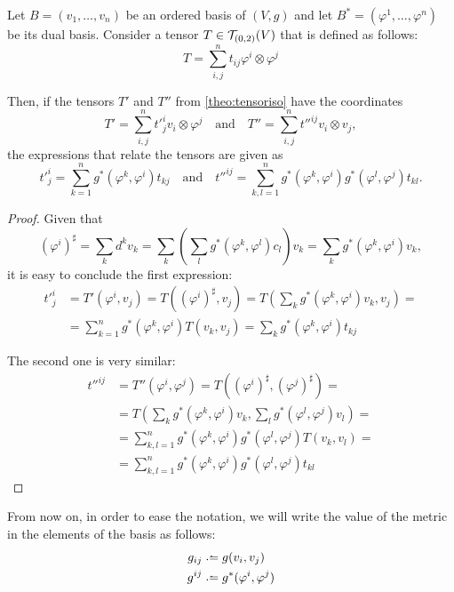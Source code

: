 \begin{proposition}
	\label{pro:musicalcoord}
	Let $B = (v_1, \dots, v_n)$ be an ordered basis of $(V,g)$ and let $B^* = (\varphi^1, \dots, \varphi^n)$ be its dual basis. Consider a tensor $T\in{\mathcal T}_{(0,2)}(V)$ that is defined as follows:
	\[
		T = \sum_{i,j}^{n} t_{ij} \varphi^i \otimes \varphi^j
	\]
	
	Then, if the tensors $T'$ and $T''$ from \autoref{theo:tensoriso} have the coordinates
	\[
		T' = \sum_{i,j}^{n} t'^i_j v_i \otimes \varphi^j
		\quad \textrm{and} \quad
		T'' = \sum_{i,j}^{n} t''^{ij} v_i \otimes v_j,
	\]
	the expressions that relate the tensors are given as
	\[
		t'^i_j = \sum_{k=1}^n g^*(\varphi^k, \varphi^i) t_{kj}
		\quad \textrm{and} \quad
		t''^{ij} = \sum_{k,l = 1}^n g^*(\varphi^k, \varphi^i) g^*(\varphi^l, \varphi^j) t_{kl}.
	\]
\end{proposition}

\begin{proof}
	Given that
	\[
		(\varphi^i)^\sharp = \sum_k d^k v_k = \sum_k (\sum_l g^*(\varphi^k, \varphi^l) c_l) v_k = \sum_k g^*(\varphi^k, \varphi^i) v_k,
	\]
	it is easy to conclude the first expression:
	\begin{align*}
		t'^i_j &= T'(\varphi^i, v_j) = T((\varphi^i)^\sharp, v_j) = T(\sum_k g^*(\varphi^k, \varphi^i) v_k, v_j) = \\
		&= \sum_{k=1}^n g^*(\varphi^k, \varphi^i) T(v_k, v_j) = \sum_k g^*(\varphi^k, \varphi^i) t_{kj}
	\end{align*}

	The second one is very similar:
	\begin{align*}
		t''^{ij} &= T''(\varphi^i, \varphi^j) = T((\varphi^i)^\sharp, (\varphi^j)^\sharp) = \\
		&= T(\sum_k g^*(\varphi^k, \varphi^i) v_k, \sum_l g^*(\varphi^l, \varphi^j) v_l) = \\
		&= \sum_{k,l=1}^n g^*(\varphi^k, \varphi^i) g^*(\varphi^l, \varphi^j) T(v_k, v_l) = \\
		&= \sum_{k,l=1}^n g^*(\varphi^k, \varphi^i) g^*(\varphi^l, \varphi^j) t_{kl}
	\end{align*}
\end{proof}

\begin{remark}
	From now on, in order to ease the notation, we will write the value of the metric in the elements of the basis as follows:
	\begin{align*}
		g_{ij} &\defeq g(v_i, v_j) \\
		g^{ij} &\defeq g^*(\varphi^i, \varphi^j)
	\end{align*}
\end{remark}

